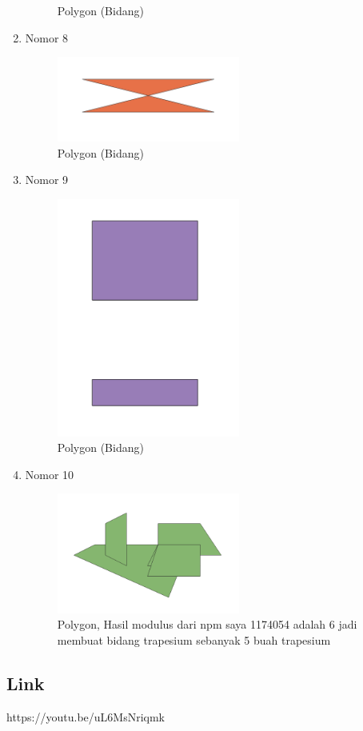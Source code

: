 \begin{enumerate}
\begin{figure}[H]
		\centering
		\caption{Polygon (Bidang)}
	\end{figure}
	\item Nomor 8
	
	\begin{figure}[H]
		\includegraphics[width=6cm]{figures/Tugas2/1174054/no8.png}
		\centering
		\caption{Polygon (Bidang)}
	\end{figure}
	\item Nomor 9
	
	\begin{figure}[H]
		\includegraphics[width=6cm]{figures/Tugas2/1174054/no9.png}
		\centering
		\caption{Polygon (Bidang)}
	\end{figure}
	\item Nomor 10
	
	\begin{figure}[H]
		\includegraphics[width=6cm]{figures/Tugas2/1174054/no10.png}
		\centering
		\caption{Polygon, Hasil modulus dari npm saya 1174054 adalah 6 jadi membuat bidang trapesium sebanyak 5 buah trapesium}
	\end{figure}
\end{enumerate}
\subsection{Link}
https://youtu.be/uL6MsNriqmk